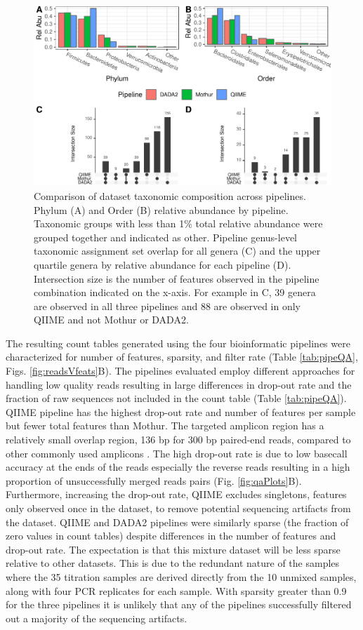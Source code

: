 \documentclass[linenumbers]{bmcart}
\begin{document}
\begin{figure}
\centering
\includegraphics{pipeTaxa-1.pdf}
\caption{\label{fig:pipeTaxa}Comparison of dataset taxonomic composition
across pipelines. Phylum (A) and Order (B) relative abundance by
pipeline. Taxonomic groups with less than 1\% total relative abundance
were grouped together and indicated as other. Pipeline genus-level
taxonomic assignment set overlap for all genera (C) and the upper
quartile genera by relative abundance for each pipeline (D). Intersection size is the number of features observed in the pipeline combination indicated on the x-axis. For example in C, 39 genera are observed in all three pipelines and 88 are observed in only QIIME and not Mothur or DADA2.}
\end{figure}

The resulting count tables generated using the four bioinformatic
pipelines were characterized for number of features, sparsity, and
filter rate (Table \ref{tab:pipeQA}, Figs. \ref{fig:readsVfeats}B). The
pipelines evaluated employ different approaches for handling low quality
reads resulting in large differences in drop-out rate and the fraction
of raw sequences not included in the count table (Table
\ref{tab:pipeQA}). QIIME pipeline has the highest drop-out rate and
number of features per sample but fewer total features than Mothur. The
targeted amplicon region has a relatively small overlap region, 136 bp
for 300 bp paired-end reads, compared to other commonly used amplicons
\cite{kozich2013development, Walters2016-lf}. The high drop-out rate is
due to low basecall accuracy at the ends of the reads especially the
reverse reads resulting in a high proportion of unsuccessfully merged
reads pairs (Fig. \ref{fig:qaPlots}B). Furthermore, increasing the
drop-out rate, QIIME excludes singletons, features only observed once in
the dataset, to remove potential sequencing artifacts from the dataset.
QIIME and DADA2 pipelines were similarly sparse (the fraction of zero
values in count tables) despite differences in the number of features
and drop-out rate. The expectation is that this mixture dataset will be
less sparse relative to other datasets. This is due to the redundant
nature of the samples where the 35 titration samples are derived
directly from the 10 unmixed samples, along with four PCR replicates for
each sample. With sparsity greater than 0.9 for the three pipelines it
is unlikely that any of the pipelines successfully filtered out a
majority of the sequencing artifacts.
\end{document}
